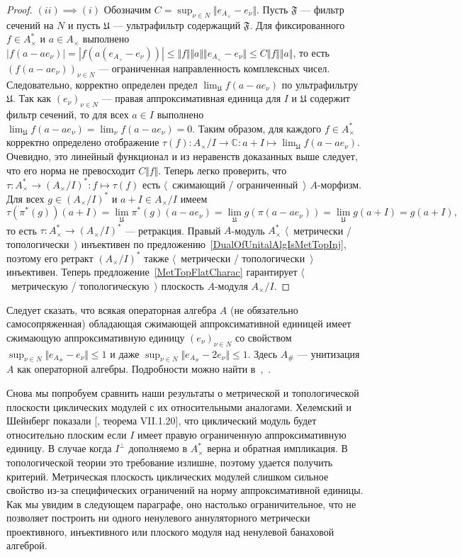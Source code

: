 \begin{proof}
$(ii) \implies (i)$ Обозначим $C=\sup_{\nu\in N}\Vert e_{A_\times
}-e_\nu\Vert$. Пусть $\mathfrak{F}$ --- фильтр сечений на $N$ и пусть
$\mathfrak{U}$ --- ультрафильтр содержащий $\mathfrak{F}$. Для фиксированного
$f\in A_\times ^*$ и $a\in A_\times $ выполнено $|f(a-a e_\nu)|=|f(a(e_{A_\times
}-e_\nu))|\leq\Vert f\Vert\Vert a\Vert\Vert e_{A_\times }-e_\nu\Vert\leq C\Vert
f\Vert\Vert a\Vert$, то есть ${(f(a-ae_\nu))}_{\nu\in N}$ --- ограниченная
направленность комплексных чисел. Следовательно, корректно определен предел
$\lim_{\mathfrak{U}}f(a-ae_\nu)$ по ультрафильтру $\mathfrak{U}$. Так как
${(e_\nu)}_{\nu\in N}$ --- правая аппроксимативная единица для $I$ и
$\mathfrak{U}$ содержит фильтр сечений, то для всех $a\in I$ выполнено
$\lim_{\mathfrak{U}}f(a-ae_\nu)=\lim_{\nu}f(a-ae_\nu)=0$. Таким образом, для
каждого $f\in A_\times ^*$ корректно определено отображение $\tau(f):A_\times
/I\to \mathbb{C}:a+I\mapsto \lim_{\mathfrak{U}} f(a-ae_\nu)$. Очевидно, это
линейный функционал и из неравенств доказанных выше следует, что его норма не
превосходит $C\Vert f\Vert$. Теперь легко проверить, что 
$\tau:A_\times ^*\to {(A_\times /I)}^*
:f\mapsto \tau(f)$ есть $\langle$~сжимающий /
ограниченный~$\rangle$ $A$-морфизм. Для всех 
$g\in{(A_\times /I)}^*$ и $a+I\in A_\times /I$ имеем
$$
\tau(\pi^*(g))(a+I)
=\lim_{\mathfrak{U}}\pi^*(g)(a-ae_\nu)
=\lim_{\mathfrak{U}} g(\pi(a-ae_\nu))
=\lim_{\mathfrak{U}} g(a+I)
=g(a+I),
$$
то есть $\tau:A_\times ^*\to {(A_\times /I)}^*$ --- ретракция. Правый $A$-модуль
$A_\times ^*$ $\langle$~метрически / топологически~$\rangle$ инъективен по
предложению~\ref{DualOfUnitalAlgIsMetTopInj}, поэтому его ретракт 
${(A_\times /I)}^*$ также 
$\langle$~метрически / топологически~$\rangle$ инъективен. Теперь
предложение~\ref{MetTopFlatCharac} гарантирует $\langle$~метрическую /
топологическую~$\rangle$ плоскость $A$-модуля $A_\times /I$.
\end{proof}

Следует сказать, что всякая операторная алгебра $A$ (не обязательно
самосопряженная) обладающая сжимающей аппроксимативной единицей имеет сжимающую
аппроксимативную единицу ${(e_\nu)}_{\nu\in N}$ со свойством $\sup_{\nu\in N}\Vert
e_{A_\#}-e_\nu\Vert\leq 1$ и даже $\sup_{\nu\in N}\Vert e_{A_\#}-2e_\nu\Vert\leq
1$. Здесь $A_\#$ --- унитизация $A$ как операторной алгебры. Подробности можно
найти в~\cite{PosAndApproxIdinBanAlg},~\cite{BleContrAppIdInOpAlg}.

Снова мы попробуем сравнить наши результаты о метрической и топологической
плоскости циклических модулей с их относительными аналогами. Хелемский и
Шейнберг показали [\cite{HelHomolBanTopAlg}, теорема VII.1.20], что циклический
модуль будет относительно плоским если $I$ имеет правую ограниченную
аппроксимативную единицу. В случае когда $I^\perp$ дополняемо в $A_\times^*$
верна и обратная импликация. В топологической теории это требование излишне,
поэтому удается получить критерий. Метрическая плоскость циклических модулей
слишком сильное свойство из-за специфических ограничений на норму
аппроксимативной единицы. Как мы увидим в следующем параграфе, оно настолько
ограничительное, что не позволяет построить ни одного ненулевого аннуляторного
метрически проективного, инъективного или плоского модуля над ненулевой
банаховой алгеброй.

